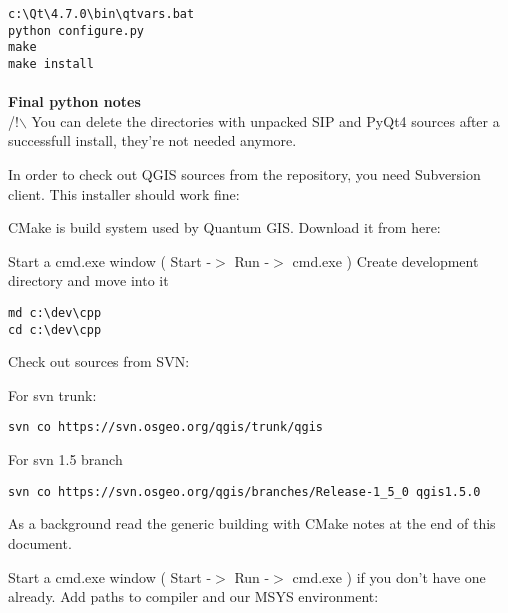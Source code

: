 \begin{verbatim}
c:\Qt\4.7.0\bin\qtvars.bat 
python configure.py 
make 
make install 
\end{verbatim}

\paragraph{}\textbf{Final python notes}\\

/!$\backslash$ You can delete the directories with unpacked SIP and PyQt4 sources after a
successfull install, they're not needed anymore.

In order to check out QGIS sources from the repository, you need Subversion
client. This installer should work fine:


CMake is build system used by Quantum GIS. Download it from here:


Start a cmd.exe window ( Start -$>$ Run -$>$ cmd.exe ) Create development 
directory and move into it

\begin{verbatim}
md c:\dev\cpp 
cd c:\dev\cpp 
\end{verbatim}

Check out sources from SVN:

For svn trunk:

\begin{verbatim}
svn co https://svn.osgeo.org/qgis/trunk/qgis 
\end{verbatim}

For svn 1.5 branch

\begin{verbatim}
svn co https://svn.osgeo.org/qgis/branches/Release-1_5_0 qgis1.5.0
\end{verbatim}

As a background read the generic building with CMake notes at the end of 
this document.

Start a cmd.exe window ( Start -$>$ Run -$>$ cmd.exe ) if you don't have one
already.  Add paths to compiler and our MSYS environment:

